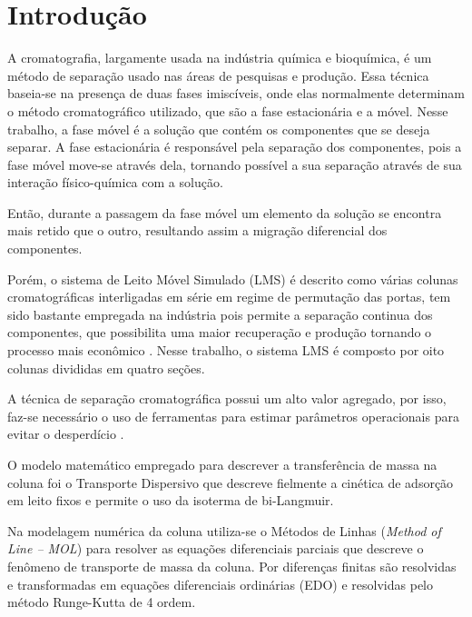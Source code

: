 \documentclass[por]{Template_SBEF}
\begin{document}
\maketitle
\thispagestyle{fancy}
\printcontactdata



\section{Introdução}

A cromatografia, largamente usada na indústria química e bioquímica, é um método de separação usado nas áreas de pesquisas e produção. Essa técnica baseia-se na presença de duas fases imiscíveis, onde elas normalmente determinam o método cromatográfico utilizado, que são a fase estacionária e a móvel. Nesse trabalho, a fase móvel é a solução que contém os componentes que se deseja separar. A fase estacionária é responsável pela separação dos componentes, pois a fase móvel move-se através dela, tornando possível a sua separação através de sua interação físico-química com a solução. 

Então, durante a passagem da fase móvel um elemento da solução se encontra mais retido que o outro, resultando assim a migração diferencial dos componentes.

Porém, o sistema de Leito Móvel Simulado (LMS) é descrito como várias colunas cromatográficas interligadas em série em regime de permutação das portas, tem sido bastante empregada na indústria pois permite a separação continua dos componentes, que possibilita uma maior recuperação e produção tornando o processo mais econômico \cite{cremasco}. Nesse trabalho, o sistema LMS é composto por oito colunas divididas em quatro seções.

A técnica de separação cromatográfica possui um alto valor agregado, por isso, faz-se necessário o uso de ferramentas para estimar parâmetros operacionais para evitar o desperdício \cite{bihain}.

O modelo matemático empregado para descrever a transferência de massa na coluna foi o Transporte Dispersivo que descreve fielmente a cinética de adsorção em leito fixos \cite{Jiang} e permite o uso da isoterma de bi-Langmuir.

Na modelagem numérica da coluna utiliza-se o Métodos de Linhas (\textit{Method of Line – MOL}) para resolver as equações diferenciais parciais que descreve o fenômeno de transporte de massa da coluna. Por diferenças finitas são resolvidas e transformadas em equações diferenciais ordinárias (EDO) e resolvidas pelo método Runge-Kutta de 4 ordem.
\end{document}
